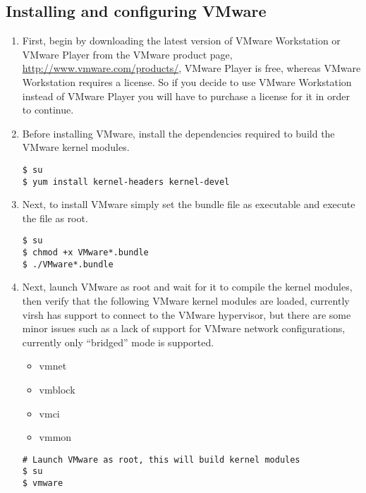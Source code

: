\subsection{Installing and configuring VMware}
\label{sec:rhvmware}
\begin{enumerate}
\item	First, begin by downloading the latest version of VMware Workstation or VMware Player  from the VMware product 
			page, \url{http://www.vmware.com/products/}, VMware Player is free, whereas VMware Workstation requires a
			license. So if you decide to use VMware Workstation instead of VMware Player you will have to purchase a license
			for it in order to continue.

\item	Before installing VMware, install the dependencies required to build the VMware kernel modules.

\lstset{language=bash,caption=Install VMware Dependencies}
\begin{lstlisting}
$ su
$ yum install kernel-headers kernel-devel
\end{lstlisting}
		
\item 	Next, to install VMware simply set the bundle file as executable and execute the file as root.
\lstset{language=bash,caption=Install VMware}
\begin{lstlisting}
$ su
$ chmod +x VMware*.bundle
$ ./VMware*.bundle
\end{lstlisting}

\item	Next, launch VMware as root and wait for it to compile the kernel modules, then verify that the following VMware 
			kernel modules are loaded, currently virsh has support to connect to the VMware hypervisor, but there are some minor
			issues such as a lack of support for VMware network configurations, currently only ``bridged'' mode is supported.
		
\begin{itemize}
\item        vmnet
\item        vmblock
\item        vmci
\item        vmmon

\end{itemize}

\lstset{language=bash,caption=Verify VMware Kernel Modules Loaded}
\begin{lstlisting}
# Launch VMware as root, this will build kernel modules
$ su
$ vmware


\end{lstlisting}
\end{enumerate}
